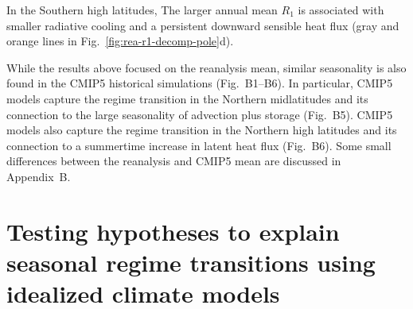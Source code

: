 \documentclass{ametsocV5}
\begin{document}
    In the Southern high latitudes,   The larger annual mean $R_1$ is associated with smaller radiative cooling and a persistent downward sensible heat flux (gray and orange lines in Fig.~\ref{fig:rea-r1-decomp-pole}d).
    
    While the results above focused on the reanalysis mean, similar seasonality is also found in the CMIP5 historical simulations (Fig.~B1--B6). In particular, CMIP5 models capture the regime transition in the Northern midlatitudes and its connection to the large seasonality of advection plus storage (Fig.~B5). CMIP5 models also capture the regime transition in the Northern high latitudes and its connection to a summertime increase in latent heat flux (Fig.~B6). Some small differences between the reanalysis and CMIP5 mean are discussed in Appendix~B.

\section{Testing hypotheses to explain seasonal regime transitions using idealized climate models} \label{sec:hypo}
\end{document}
